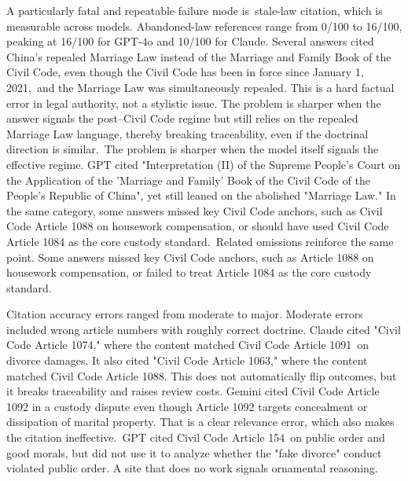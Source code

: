 A particularly fatal and repeatable failure mode is~stale-law citation, which is measurable across models. Abandoned-law references range from 0/100 to 16/100, peaking at 16/100 for GPT-4o and 10/100 for Claude. Several answers cited China's repealed Marriage Law instead of the Marriage and Family Book of the Civil Code, even though the Civil Code has been in force since January 1, 2021,~and the Marriage Law was simultaneously repealed. This is a hard factual error in legal authority, not a stylistic issue. The problem is sharper when the answer signals the post--Civil Code regime but still relies on the repealed Marriage Law language, thereby breaking traceability, even if the doctrinal direction is similar.~The problem is sharper when the model itself signals the effective regime. GPT cited "Interpretation (II) of the Supreme People's Court on the Application of the 'Marriage and Family' Book of the Civil Code of the People's Republic of China", yet still leaned on the abolished "Marriage Law." In the same category, some answers missed key Civil Code anchors, such as Civil Code Article 1088 on housework compensation, or should have used Civil Code Article 1084 as the core custody standard.~Related omissions reinforce the same point. Some answers missed key Civil Code anchors, such as Article 1088 on housework compensation, or failed to treat Article 1084 as the core custody standard.

Citation accuracy errors ranged from moderate to major. Moderate errors included wrong article numbers with roughly correct doctrine. Claude cited "Civil Code Article 1074," where the content matched Civil Code Article 1091~on divorce damages. It also cited "Civil Code Article 1063," where the content matched Civil Code Article 1088. This does not automatically flip outcomes, but it breaks traceability and raises review costs. Gemini cited Civil Code Article 1092 in a custody dispute even though Article 1092 targets concealment or dissipation of marital property. That is a clear relevance error, which also makes the citation ineffective.~GPT cited Civil Code Article 154~on public order and good morals, but did not use it to analyze whether the "fake divorce" conduct violated public order. A site that does no work signals ornamental reasoning.~

